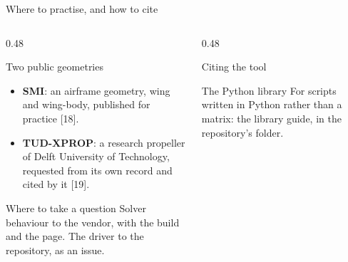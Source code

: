 \begin{frame}{Where to practise, and how to cite}
\begin{columns}[T]
\begin{column}{0.48\textwidth}
\begin{block}{Two public geometries}
\begin{itemize}\small
  \item \textbf{SMI}: an airframe geometry, wing and wing-body, published
        for practice [18].
  \item \textbf{TUD-XPROP}: a research propeller of Delft University of
        Technology, requested from its own record and cited by it [19].
\end{itemize}
\end{block}
\begin{block}{Where to take a question}
\small Solver behaviour to the vendor, with the build and the page. The
driver to the repository, as an issue.
\end{block}
\end{column}
\begin{column}{0.48\textwidth}
\begin{block}{Citing the tool}
\small \pkgcitation
\end{block}
\begin{block}{The Python library}
\small For scripts written in Python rather than a matrix: the library
guide,  in the repository's
 folder.
\end{block}
\end{column}
\end{columns}
\end{frame}
